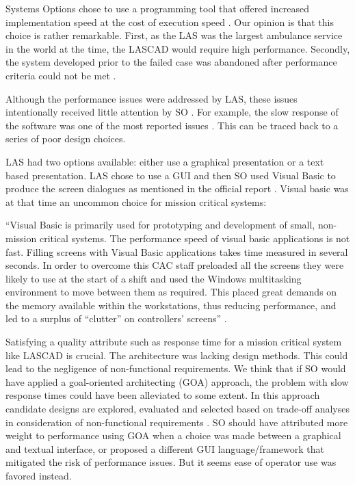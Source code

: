 Systems Options chose to use a programming tool that offered increased implementation speed at the cost of execution speed \autocite[3128]{officialreport}.
Our opinion is that this choice is rather remarkable.
First, as the LAS was the largest ambulance service in the world at the time, the LASCAD would require high performance.
Secondly, the system developed prior to the failed case was abandoned after performance criteria could not be met \autocite[2017]{officialreport}.

Although the performance issues were addressed by LAS, these issues intentionally received little attention by SO \autocite[3128]{officialreport}.
For example, the slow response of the software was one of the most reported issues \autocite[3126]{officialreport}.
This can be traced back to a series of poor design choices.

LAS had two options available: either use a graphical presentation or a text based presentation.
LAS chose to use a GUI and then SO used Visual Basic to produce the screen dialogues as mentioned in the official report \autocite[3128]{officialreport}.
Visual basic was at that time an uncommon choice for mission critical systems:

\begin{itshape}
\begin{addmargin}[1em]{1em}
``Visual Basic is primarily used for prototyping and development of small, non-mission critical systems.
The performance speed of visual basic applications is not fast.
Filling screens with Visual Basic applications takes time measured in several seconds.
In order to overcome this CAC staff preloaded all the screens they were likely to use at the start of a shift and used the Windows multitasking environment to move between them as required.
This placed great demands on the memory available within the workstations, thus reducing performance,
and led to a surplus of ``clutter'' on controllers' screens'' \autocite[3128]{officialreport}.
\end{addmargin}
\end{itshape}

Satisfying a quality attribute such as response time for a mission critical system like LASCAD is crucial.
The architecture was lacking design methods.
This could lead to the negligence of non-functional requirements.
We think that if SO would have applied a goal-oriented architecting (GOA) approach,
the problem with slow response times could have been alleviated to some extent.
In this approach candidate designs are explored, evaluated and selected based on trade-off analyses in consideration of non-functional requirements \autocite[92]{chung2011goal}.
SO should have attributed more weight to performance using GOA when a choice was made between a graphical and textual interface,
or proposed a different GUI language/framework that mitigated the risk of performance issues.
But it seems ease of operator use was favored instead.
